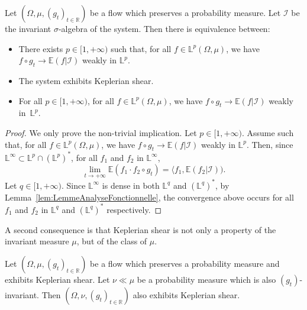 \documentclass[10pt]{amsart}
\theoremstyle{definition}\newtheorem{defi}[theo]{Definition}\newtheorem{rema}[theo]{Remark}\newtheorem{exam}[theo]{Example}\newtheorem{exem}[theo]{Example}\newtheorem{nota}[theo]{Notation}
\newcommand{\R}{\mathbb{R}}
\newcommand{\Ebb}{\mathbb{E}}
\newcommand{\Lbb}{\mathbb{L}}
\newcommand{\Ical}{\mathcal{I}}
\begin{document}
\begin{prop}
Let $(\Omega, \mu, (g_t)_{t \in \R})$ be a flow which preserves a probability measure. Let $\Ical$ be the invariant $\sigma$-algebra of the system. Then there is equivalence between:
\begin{itemize}
\item There exists $p \in [1, + \infty)$ such that, for all $f \in \Lbb^p (\Omega, \mu)$, we have $f \circ g_t \to \Ebb (f | \Ical)$ weakly in $\Lbb^p$.
\item The system exhibits Keplerian shear.
\item For all $p \in [1, + \infty)$, for all $f \in \Lbb^p (\Omega, \mu)$, we have $f \circ g_t \to \Ebb (f | \Ical)$ weakly in~$\Lbb^p$.
\end{itemize}
\end{prop}

\begin{proof}
We only prove the non-trivial implication. Let $p \in [1, + \infty)$. Assume such that, for all $f \in \Lbb^p (\Omega, \mu)$, we have $f \circ g_t \to \Ebb (f | \Ical)$ weakly in $\Lbb^p$. Then, since $\Lbb^\infty \subset \Lbb^p \cap (\Lbb^p)^*$, for all $f_1$ and $f_2$ in $\Lbb^\infty$,
\[
\lim_{t \to + \infty} \Ebb(f_1 \cdot f_2 \circ g_t) = \langle f_1, \Ebb (f_2 | \Ical)).
\]
Let $q \in [1, + \infty)$. Since $\Lbb^\infty$ is dense in both $\Lbb^q$ and $(\Lbb^q)^*$, by Lemma~\ref{lem:LemmeAnalyseFonctionnelle}, the convergence above occurs for all $f_1$ and $f_2$ in $\Lbb^q$ and $(\Lbb^q)^*$ respectively.
\end{proof}
\goodbreak


A second consequence is that Keplerian shear is not only a property of the invariant measure $\mu$, but of the class of $\mu$.


\begin{prop}\label{prop:MesuresAbsContinues}

Let $(\Omega, \mu, (g_t)_{t \in \R})$ be a flow which preserves a probability measure and exhibits Keplerian shear. Let $\nu \ll \mu$ be a probability measure which is also $(g_t)$-invariant. Then $(\Omega, \nu, (g_t)_{t \in \R})$ also exhibits Keplerian shear.
\end{prop}
\end{document}
